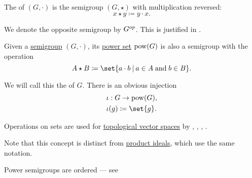 \begin{definition}
\begin{thmenum}[series=def:semigroup]
     The  of \( (G, \cdot) \) is the semigroup \( (G, \star) \) with multiplication reversed:
    \begin{equation*}
      x \star y \coloneqq y \cdot x.
    \end{equation*}

    We denote the opposite semigroup by \( G^{op} \). This is justified in .
  \end{thmenum}
\end{definition}

\begin{definition}\label{def:power_semigroup}
  Given a \hyperref[def:semigroup]{semigroup} \( (G, \cdot) \), its \hyperref[def:basic_set_operations/power_set]{power set} \( \operatorname{pow}(G) \) is also a semigroup with the operation
  \begin{equation*}
    A \star B \coloneqq \set{ a \cdot b \given a \in A \T{and} b \in B }.
  \end{equation*}

  We will call this the  of \( G \). There is an obvious injection
  \begin{equation*}
    \begin{aligned}
      &\iota: G \to \pow(G), \\
      &\iota(g) \coloneqq \set{ g }.
    \end{aligned}
  \end{equation*}
\end{definition}
\begin{comments}
  \item Operations on sets are used for \hyperref[def:topological_vector_space]{topological vector spaces} by , , , .

  \item Note that this concept is distinct from \hyperref[def:semiring_ideal/product]{product ideals}, which use the same notation.

  \item Power semigroups are ordered --- see 
\end{comments}

